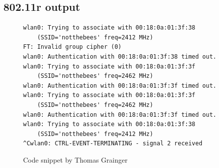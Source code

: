 \documentclass[12pt,a4paper,titlepage]{article}
\begin{document}
\subsection{802.11r output}
\begin{figure}[h!]
\begin{Verbatim}[frame=single]
wlan0: Trying to associate with 00:18:0a:01:3f:38
	(SSID='notthebees' freq=2412 MHz)
FT: Invalid group cipher (0)
wlan0: Authentication with 00:18:0a:01:3f:38 timed out.
wlan0: Trying to associate with 00:18:0a:01:3f:3f
	(SSID='notthebees' freq=2462 MHz)
wlan0: Authentication with 00:18:0a:01:3f:3f timed out.
wlan0: Trying to associate with 00:18:0a:01:3f:3f
	(SSID='notthebees' freq=2462 MHz)
wlan0: Authentication with 00:18:0a:01:3f:3f timed out.
wlan0: Trying to associate with 00:18:0a:01:3f:38
	(SSID='notthebees' freq=2412 MHz)
^Cwlan0: CTRL-EVENT-TERMINATING - signal 2 received
\end{Verbatim}
\caption{Code snippet by Thomas Grainger}
\end{figure}
\end{document}
